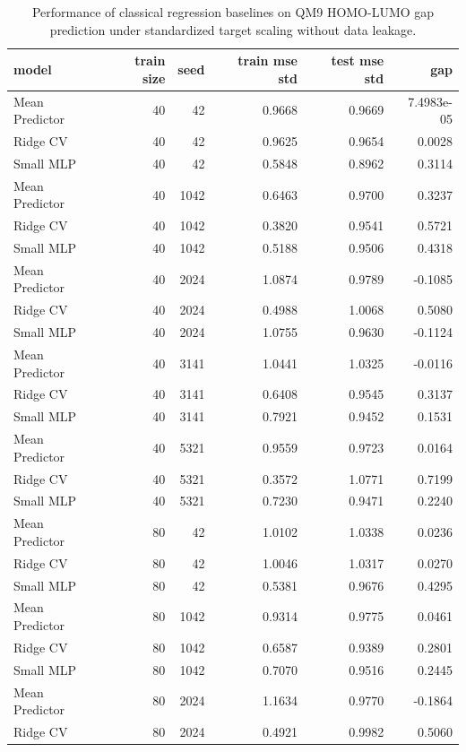 \begin{table}[htbp]
\centering
\caption{Performance of classical regression baselines on QM9 HOMO-LUMO gap prediction under standardized target scaling without data leakage.}
\label{tab:classical_baselines}
\begin{tabular}{lrrrrr}
\toprule
\textbf{model} & \textbf{train size} & \textbf{seed} & \textbf{train mse std} & \textbf{test mse std} & \textbf{gap} \\
\midrule
Mean Predictor & 40 & 42 & 0.9668 & 0.9669 & 7.4983e-05 \\
Ridge CV & 40 & 42 & 0.9625 & 0.9654 & 0.0028 \\
Small MLP & 40 & 42 & 0.5848 & 0.8962 & 0.3114 \\
Mean Predictor & 40 & 1042 & 0.6463 & 0.9700 & 0.3237 \\
Ridge CV & 40 & 1042 & 0.3820 & 0.9541 & 0.5721 \\
Small MLP & 40 & 1042 & 0.5188 & 0.9506 & 0.4318 \\
Mean Predictor & 40 & 2024 & 1.0874 & 0.9789 & -0.1085 \\
Ridge CV & 40 & 2024 & 0.4988 & 1.0068 & 0.5080 \\
Small MLP & 40 & 2024 & 1.0755 & 0.9630 & -0.1124 \\
Mean Predictor & 40 & 3141 & 1.0441 & 1.0325 & -0.0116 \\
Ridge CV & 40 & 3141 & 0.6408 & 0.9545 & 0.3137 \\
Small MLP & 40 & 3141 & 0.7921 & 0.9452 & 0.1531 \\
Mean Predictor & 40 & 5321 & 0.9559 & 0.9723 & 0.0164 \\
Ridge CV & 40 & 5321 & 0.3572 & 1.0771 & 0.7199 \\
Small MLP & 40 & 5321 & 0.7230 & 0.9471 & 0.2240 \\
Mean Predictor & 80 & 42 & 1.0102 & 1.0338 & 0.0236 \\
Ridge CV & 80 & 42 & 1.0046 & 1.0317 & 0.0270 \\
Small MLP & 80 & 42 & 0.5381 & 0.9676 & 0.4295 \\
Mean Predictor & 80 & 1042 & 0.9314 & 0.9775 & 0.0461 \\
Ridge CV & 80 & 1042 & 0.6587 & 0.9389 & 0.2801 \\
Small MLP & 80 & 1042 & 0.7070 & 0.9516 & 0.2445 \\
Mean Predictor & 80 & 2024 & 1.1634 & 0.9770 & -0.1864 \\
Ridge CV & 80 & 2024 & 0.4921 & 0.9982 & 0.5060 \\

\end{tabular}
\end{table}

